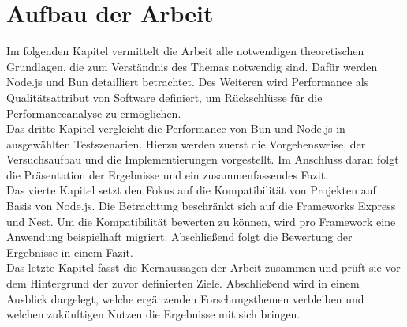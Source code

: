\section{Aufbau der Arbeit} \label{sec:introduction-overview}
Im folgenden Kapitel vermittelt die Arbeit alle notwendigen theoretischen Grundlagen, die zum Verständnis des Themas notwendig sind. Dafür werden Node.js und Bun detailliert betrachtet. Des Weiteren wird Performance als Qualitätsattribut von Software definiert, um Rückschlüsse für die Performanceanalyse zu ermöglichen.\\

\noindent
Das dritte Kapitel vergleicht die Performance von Bun und Node.js in ausgewählten Testszenarien. Hierzu werden zuerst die Vorgehensweise, der Versuchsaufbau und die Implementierungen vorgestellt. Im Anschluss daran folgt die Präsentation der Ergebnisse und ein zusammenfassendes Fazit.\\

\noindent
Das vierte Kapitel setzt den Fokus auf die Kompatibilität von Projekten auf Basis von Node.js. Die Betrachtung beschränkt sich auf die Frameworks Express und Nest. Um die Kompatibilität bewerten zu können, wird pro Framework eine Anwendung beispielhaft migriert. Abschließend folgt die Bewertung der Ergebnisse in einem Fazit.\\

\noindent
Das letzte Kapitel fasst die Kernaussagen der Arbeit zusammen und prüft sie vor dem Hintergrund der zuvor definierten Ziele. Abschließend wird in einem Ausblick dargelegt, welche ergänzenden Forschungsthemen verbleiben und welchen zukünftigen Nutzen die Ergebnisse mit sich bringen.